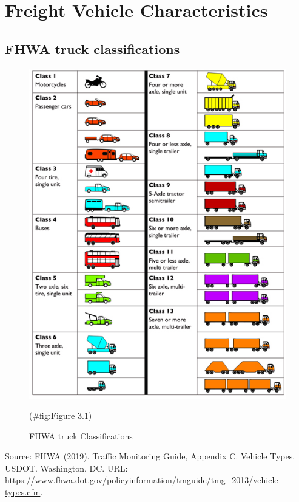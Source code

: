 \documentclass[
]{book}
\begin{document}
\hypertarget{VehChars}{%
\chapter{Freight Vehicle Characteristics}\label{VehChars}}

\hypertarget{VehChars-Classes}{%
\section{FHWA truck classifications}\label{VehChars-Classes}}

\begin{figure}

{\centering \includegraphics{./Images/VehClassesFHWA} 

}

\caption{FHWA truck Classifications}(\#fig:Figure 3.1)
\end{figure}

Source: FHWA (2019). Traffic Monitoring Guide, Appendix C. Vehicle Types. USDOT. Washington, DC. URL: \url{https://www.fhwa.dot.gov/policyinformation/tmguide/tmg_2013/vehicle-types.cfm}.
\end{document}

